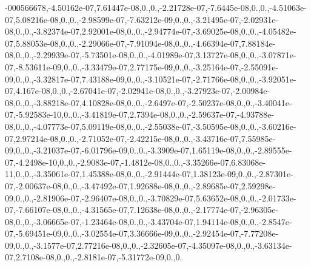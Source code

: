 \begin{DoxyCompactItemize}
-000566678,-\/4.\-50162e-\/07,7.\-61447e-\/08,0.,0.,-\/2.\-21728e-\/07,-\/7.\-6445e-\/08,0.,0.,-\/4.\-51063e-\/07,5.\-08216e-\/08,0.,0.,-\/2.\-98599e-\/07,-\/7.\-63212e-\/09,0.,0.,-\/3.\-21495e-\/07,-\/2.\-02931e-\/08,0.,0.,-\/3.\-82374e-\/07,2.\-92001e-\/08,0.,0.,-\/2.\-94774e-\/07,-\/3.\-69025e-\/08,0.,0.,-\/4.\-05482e-\/07,5.\-88053e-\/08,0.,0.,-\/2.\-29066e-\/07,-\/7.\-91094e-\/08,0.,0.,-\/4.\-66394e-\/07,7.\-88184e-\/08,0.,0.,-\/2.\-29939e-\/07,-\/5.\-73501e-\/08,0.,0.,-\/4.\-01989e-\/07,3.\-13727e-\/08,0.,0.,-\/3.\-07871e-\/07,-\/8.\-53611e-\/09,0.,0.,-\/3.\-33479e-\/07,2.\-77175e-\/09,0.,0.,-\/3.\-25164e-\/07,-\/2.\-55091e-\/09,0.,0.,-\/3.\-32817e-\/07,7.\-43188e-\/09,0.,0.,-\/3.\-10521e-\/07,-\/2.\-71766e-\/08,0.,0.,-\/3.\-92051e-\/07,4.\-167e-\/08,0.,0.,-\/2.\-67041e-\/07,-\/2.\-02941e-\/08,0.,0.,-\/3.\-27923e-\/07,-\/2.\-00984e-\/08,0.,0.,-\/3.\-88218e-\/07,4.\-10828e-\/08,0.,0.,-\/2.\-6497e-\/07,-\/2.\-50237e-\/08,0.,0.,-\/3.\-40041e-\/07,-\/5.\-92583e-\/10,0.,0.,-\/3.\-41819e-\/07,2.\-7394e-\/08,0.,0.,-\/2.\-59637e-\/07,-\/4.\-93788e-\/08,0.,0.,-\/4.\-07773e-\/07,5.\-09119e-\/08,0.,0.,-\/2.\-55038e-\/07,-\/3.\-50595e-\/08,0.,0.,-\/3.\-60216e-\/07,2.\-97214e-\/08,0.,0.,-\/2.\-71052e-\/07,-\/2.\-42215e-\/08,0.,0.,-\/3.\-43716e-\/07,7.\-55985e-\/09,0.,0.,-\/3.\-21037e-\/07,-\/6.\-01796e-\/09,0.,0.,-\/3.\-3909e-\/07,1.\-65119e-\/08,0.,0.,-\/2.\-89555e-\/07,-\/4.\-2498e-\/10,0.,0.,-\/2.\-9083e-\/07,-\/1.\-4812e-\/08,0.,0.,-\/3.\-35266e-\/07,6.\-83068e-\/11,0.,0.,-\/3.\-35061e-\/07,1.\-45388e-\/08,0.,0.,-\/2.\-91444e-\/07,1.\-38123e-\/09,0.,0.,-\/2.\-87301e-\/07,-\/2.\-00637e-\/08,0.,0.,-\/3.\-47492e-\/07,1.\-92688e-\/08,0.,0.,-\/2.\-89685e-\/07,2.\-59298e-\/09,0.,0.,-\/2.\-81906e-\/07,-\/2.\-96407e-\/08,0.,0.,-\/3.\-70829e-\/07,5.\-63652e-\/08,0.,0.,-\/2.\-01733e-\/07,-\/7.\-66107e-\/08,0.,0.,-\/4.\-31565e-\/07,7.\-12638e-\/08,0.,0.,-\/2.\-17774e-\/07,-\/2.\-96305e-\/08,0.,0.,-\/3.\-06665e-\/07,-\/1.\-23464e-\/08,0.,0.,-\/3.\-43704e-\/07,1.\-94114e-\/08,0.,0.,-\/2.\-8547e-\/07,-\/5.\-69451e-\/09,0.,0.,-\/3.\-02554e-\/07,3.\-36666e-\/09,0.,0.,-\/2.\-92454e-\/07,-\/7.\-77208e-\/09,0.,0.,-\/3.\-1577e-\/07,2.\-77216e-\/08,0.,0.,-\/2.\-32605e-\/07,-\/4.\-35097e-\/08,0.,0.,-\/3.\-63134e-\/07,2.\-7108e-\/08,0.,0.,-\/2.\-8181e-\/07,-\/5.\-31772e-\/09,0.,0.
\end{DoxyCompactItemize}
